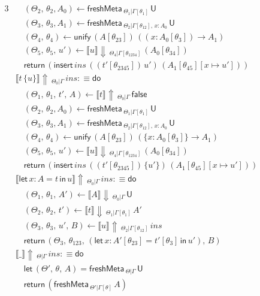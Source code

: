 \documentclass[acmsmall,review,anonymous,prologue,dvipsnames]{acmart}\settopmatter{printfolios=true,printccs=false,printacmref=false}
\newcommand{\slet}{\boldsymbol{\mathsf{let}}}
\renewcommand{\sin}{\boldsymbol{\mathsf{in}}}
\renewcommand{\U}{\mathsf{U}}
\newcommand{\freshMeta}[3]{\mathsf{freshMeta}\,_{#1|#2}\,#3}
\newcommand{\unify}{\mathsf{unify}}
\newcommand{\echeck}[4]{\llbracket#1\rrbracket\!\Downarrow\,_{#2|#3}\,#4}
\newcommand{\einfer}[4]{\llbracket#1\rrbracket\!\Uparrow\,_{#3|#4}\,#2}
\newcommand{\edo}{\boldsymbol{\mathsf{do}}}
\newcommand{\ereturn}{\boldsymbol{\mathsf{return}}}
\newcommand{\false}{\mathsf{false}}
\theoremstyle{remark}
\begin{document}
\begin{alignat*}{3}
  &\quad (\Theta_2,\,\theta_2,A_0) \leftarrow \freshMeta{\Theta_1}{\Gamma[\theta_1]}{\U}\\
  &\quad (\Theta_3,\,\theta_3,A_1) \leftarrow \freshMeta{\Theta_2}{\Gamma[\theta_{12}],\,x:A_0}{\U}\\
  &\quad (\Theta_4,\,\theta_4) \leftarrow \unify\,(A[\theta_{23}])\,((x : A_0[\theta_3])\to A_1)\\
  &\quad (\Theta_5,\,\theta_5,\,u') \leftarrow \echeck{u}{\Theta_4}{\Gamma[\theta_{1234}]}{(A_0[\theta_{34}])}\\
  &\quad \ereturn\,(\mathsf{insert}\,{ins}\,{((t'[\theta_{2345}])\,u')}\,{(A_1[\theta_{45}][x\mapsto u'])})\\
  &\einfer{t\,\{u\}}{ins}{\Theta_0}{\Gamma} :\equiv \edo \\
  &\quad (\Theta_1,\,\theta_1,\,t',\,A) \leftarrow \einfer{t}{\false}{\Theta_0}{\Gamma}\\
  &\quad (\Theta_2,\,\theta_2,A_0) \leftarrow \freshMeta{\Theta_1}{\Gamma[\theta_1]}{\U}\\
  &\quad (\Theta_3,\,\theta_3,A_1) \leftarrow \freshMeta{\Theta_2}{\Gamma[\theta_{12}],\,x:A_0}{\U}\\
  &\quad (\Theta_4,\,\theta_4) \leftarrow \unify\,(A[\theta_{23}])\,(\{x : A_0[\theta_3]\}\to A_1)\\
  &\quad (\Theta_5,\,\theta_5,\,u') \leftarrow \echeck{u}{\Theta_4}{\Gamma[\theta_{1234}]}{(A_0[\theta_{34}])}\\
  &\quad \ereturn\,(\mathsf{insert}\,{ins}\,{((t'[\theta_{2345}])\,\{u'\})}\,{(A_1[\theta_{45}][x\mapsto u'])})\\
  &\einfer{\slet\,x:A=t\,\sin\,u}{ins}{\Theta_0}{\Gamma} :\equiv \edo \\
  &\quad(\Theta_1,\,\theta_1,\,A') \leftarrow \echeck{A}{\Theta_0}{\Gamma}{\U}\\
  &\quad(\Theta_2,\,\theta_2,\,t') \leftarrow \echeck{t}
                {\Theta_1}{\Gamma[\theta_1]}{A'}\\
  &\quad(\Theta_3,\,\theta_3,\,u',\,B) \leftarrow
                \einfer{u}{ins}{\Theta_2}{\Gamma[\theta_{12}]}\\
  &\quad\ereturn\,(\Theta_3,\,\theta_{123},\,(\slet\,x:A'[\theta_{23}]=t'[\theta_3]\,\sin\,u'),\,B)\\
  &\einfer{\_}{ins}{\Theta}{\Gamma} :\equiv \edo \\
  &\quad \slet\,(\Theta',\,\theta,\,A) = \freshMeta{\Theta}{\Gamma}{\U}\\
  &\quad \ereturn\,(\freshMeta{\Theta'}{\Gamma[\theta]}{A})\\
\end{alignat*}
\endgroup
\end{document}
